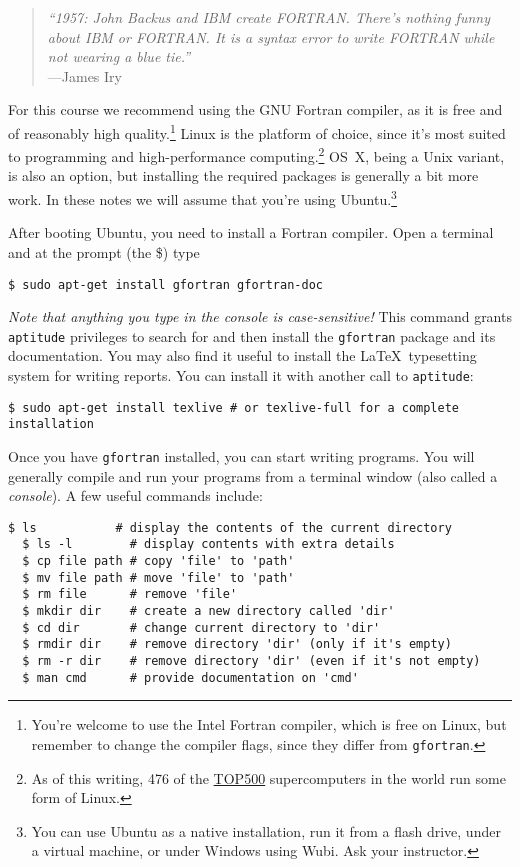 \label{chap:Getting your toes wet}
\begin{quote}\small
  \emph{``1957: John Backus and IBM create FORTRAN. There's nothing funny about IBM or FORTRAN. It is a syntax error to write FORTRAN while not wearing a blue tie.''} \\ \hspace*{\fill}---James Iry
\end{quote}

For this course we recommend using the GNU Fortran compiler, as it is free and of reasonably high quality.\footnote{You're welcome to use the Intel Fortran compiler, which is free on Linux, but remember to change the compiler flags, since they differ from \texttt{gfortran}.}
Linux is the platform of choice, since it's most suited to programming and high-performance computing.\footnote{As of this writing, 476 of the \href{http://www.top500.org/list/2013/11/}{TOP500} supercomputers in the world run some form of Linux.}
OS~X, being a Unix variant, is also an option, but installing the required packages is generally a bit more work.
In these notes we will assume that you're using Ubuntu.\footnote{You can use Ubuntu as a native installation, run it from a flash drive, under a virtual machine, or under Windows using Wubi.
Ask your instructor.}

After booting Ubuntu, you need to install a Fortran compiler.
Open a terminal and at the prompt (the \$) type
\begin{lstlisting}[style=prompt, nolol]
  $ sudo apt-get install gfortran gfortran-doc
\end{lstlisting}
\emph{Note that anything you type in the console is case-sensitive!}
This command grants \texttt{aptitude} privileges to search for and then install the \texttt{gfortran} package and its documentation.
You may also find it useful to install the \LaTeX\ typesetting system for writing reports.
You can install it with another call to \texttt{aptitude}:
\begin{lstlisting}[style=prompt, nolol, breaklines=false]
  $ sudo apt-get install texlive # or texlive-full for a complete installation
\end{lstlisting}

Once you have \texttt{gfortran} installed, you can start writing programs.
You will generally compile and run your programs from a terminal window (also called a \emph{console}).
A few useful commands include:
\begin{lstlisting}[style=prompt, nolol, linewidth=30cm]
  $ ls           # display the contents of the current directory
  $ ls -l        # display contents with extra details
  $ cp file path # copy 'file' to 'path'
  $ mv file path # move 'file' to 'path'
  $ rm file      # remove 'file'
  $ mkdir dir    # create a new directory called 'dir'
  $ cd dir       # change current directory to 'dir'
  $ rmdir dir    # remove directory 'dir' (only if it's empty)
  $ rm -r dir    # remove directory 'dir' (even if it's not empty)
  $ man cmd      # provide documentation on 'cmd'
\end{lstlisting}

